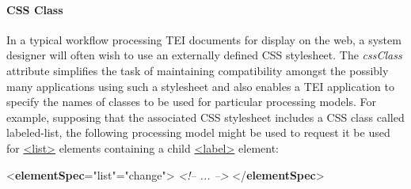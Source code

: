 \paragraph[{CSS Class}]{CSS Class}\label{TDPMCC}\par
In a typical workflow processing TEI documents for display on the web, a system designer will often wish to use an externally defined CSS stylesheet. The {\itshape cssClass} attribute simplifies the task of maintaining compatibility amongst the possibly many applications using such a stylesheet and also enables a TEI application to specify the names of classes to be used for particular processing models. For example, supposing that the associated CSS stylesheet includes a CSS class called \textsf{labeled-list}, the following processing model might be used to request it be used for \hyperref[TEI.list]{<list>} elements containing a child \hyperref[TEI.label]{<label>} element: \par\bgroup{}\exampleFont \begin{shaded}\noindent\mbox{}{<\textbf{elementSpec}\hspace*{1em}{ident}="{list}"\hspace*{1em}{mode}="{change}">}\mbox{}\newline 
{}\mbox{}\newline 
\textit{<!-- ... -->}\mbox{}\newline 
{}\mbox{}\newline 
{</\textbf{elementSpec}>}\end{shaded}\egroup\par \par
